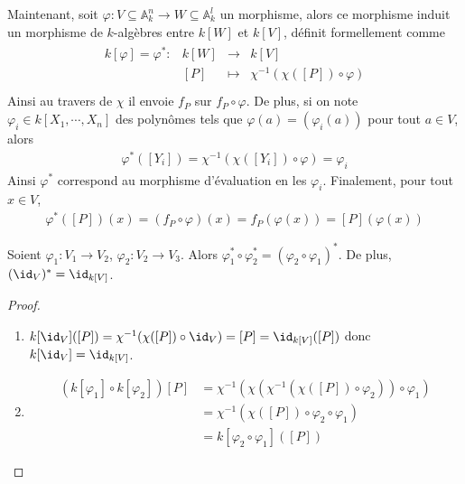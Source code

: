         Maintenant, soit $\varphi : V \subseteq \mathbb{A}_k^n \to W \subseteq \mathbb{A}_k^l$ un morphisme, alors ce morphisme induit un morphisme de $k$-algèbres entre $k[W]$ et $k[V]$, définit formellement comme
        \begin{align*}
            \begin{array}{cccc}
                k[\varphi] = \varphi^* : & k[W] & \to & k[V] \\
                & [P] & \mapsto & \chi^{-1}(\chi([P]) \circ \varphi) \\
            \end{array}
        \end{align*}
        Ainsi au travers de $\chi$ il envoie $f_P$ sur $f_P \circ \varphi$. De plus, si on note $\varphi_i \in k[X_1, \cdots, X_n]$ des polynômes tels que $\varphi(a) = (\varphi_i(a))$ pour tout $a \in V$, alors 
        \begin{align*}
            \varphi^*([Y_i]) = \chi^{-1}(\chi([Y_i]) \circ \varphi) = \varphi_i
        \end{align*}
        Ainsi $\varphi^*$ correspond au morphisme d'évaluation en les $\varphi_i$. Finalement, pour tout $x \in V$,
        \begin{align*}
            \varphi^*([P])(x) = (f_P \circ \varphi)(x) = f_P(\varphi(x)) = [P](\varphi(x))
        \end{align*}
        \begin{prop}
            \label{phistarfunct}
            Soient $\varphi_1 : V_1 \to V_2$, $\varphi_2 : V_2 \to V_3$. Alors $\varphi_1^* \circ \varphi_2^* = (\varphi_2 \circ \varphi_1)^*$. De plus, $(\id_V)^* = \id_{k[V]}$.
        \end{prop}
        \begin{proof}
            \begin{enumerate}
                \item $k[\id_V]([P]) = \chi^{-1}(\chi([P]) \circ \id_V) = [P] = \id_{k[V]}([P])$ donc $k[\id_V] = \id_{k[V]}$.
                \item
                \begin{align*}
                    (k[\varphi_1] \circ k[\varphi_2])[P] &= \chi^{-1}(\chi( \chi^{-1}(\chi([P]) \circ \varphi_2) ) \circ \varphi_1) \\
                    &= \chi^{-1}(\chi([P]) \circ \varphi_2 \circ \varphi_1) \\
                    &= k[\varphi_2 \circ \varphi_1]([P])
                \end{align*}
            \end{enumerate}
        \end{proof}
